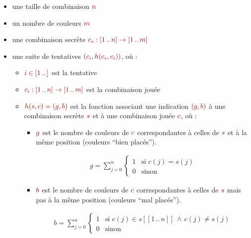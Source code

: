 \documentclass[a4paper]{article}
\newcommand{\isep}{\,..\,}
\renewcommand{\(}{\begin{math}\color{brick}}
\renewcommand{\)}{\end{math}}
\newcommand{\blockmath}[1]{{\color{brick}\begin{align*}#1\end{align*}}}
\newcommand{\lnd}{\,\land\,}
\begin{document}
\begin{itemize}
  
\item une taille de combinaison \(n\)
  
\item un nombre de couleurs \(m\)
  
\item une combinaison secrète \(c_s : [1 \isep n] \rightarrow [1 \isep m]\)
  
\item une suite de tentatives \((c_i, h(c_s,c_i))\), où :
  
  \begin{itemize}
    
  \item \(i \in [1 \isep ]\) est la tentative
    
  \item \(c_i : [1 \isep n] \rightarrow [1 \isep m]\) est la combinaison jouée
    
  \item \(h(s,c) = (g,b)\) est la fonction associant une indication \((g,b)\) à une combinaison secrète \(s\) et à une combinaison jouée \(c\), où :
    
    \begin{itemize}
      
    \item \(g\) est le nombre de couleurs de \(c\) correspondantes
      à celles de \(s\) et à la même position (couleurs ``bien
      placés'').
      
      \blockmath{
        g = \sum_{j=0}^{n}
        \begin{cases}
          1 & \text{si } c(j)=s(j) \\
          0 & \text{sinon}
        \end{cases}
      }
      
    \item \(b\) est le nombre de couleurs de \(c\) correspondantes
      à celles de \(s\) mais pas à la même position (couleurs ``mal
      placés'').
      
      \blockmath{
        b = \sum_{j=0}^{n}
        \begin{cases}
          1 & \text{si } c(j) \in s[[1 \isep n]] \lnd c(j) \neq s(j) \\
          0 & \text{sinon}
        \end{cases}
      }
      
    \end{itemize}
  \end{itemize}
\end{itemize}
\end{document}
